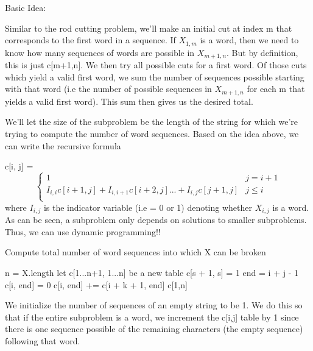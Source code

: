 \documentclass[11pt,a4paper]{article}
\begin{document}
Basic Idea: 

Similar to the rod cutting problem, we'll make an initial cut at index m that corresponds to the first word in a sequence. If $X_{1,m}$ is a word, then we need to know how many sequences of words are possible in $X_{m+1, n}$. But by definition, this is just c[m+1,n]. We then try all possible cuts for a first word. Of those cuts which yield a valid first word, we sum the number of sequences possible starting with that word (i.e the number of possible sequences in $X_{m+1,n}$ for each m that yields a valid first word). This sum then gives us the desired total.

We'll let the size of the subproblem be the length of the string for which we're trying to compute the number of word sequences. Based on the idea above, we can write the recursive formula

c[i, j] = 
\[ \begin{cases} 
      1 & j = i + 1 \\
      I_{i,i}c[i+1,j] + I_{i,i+1}c[i+2,j] ... + I_{i,j}c[j+1,j] & j \leq i \\
   \end{cases}
\]
where $I_{i,j}$ is the indicator variable (i.e = 0 or 1) denoting whether $X_{i,j}$ is a word. As can be seen, a subproblem only depends on solutions to smaller subproblems. Thus, we can use dynamic programming!!

\begin{algorithm}
\caption{Compute total number of word sequences into which X can be broken}
\begin{algorithmic}[1]
	\State n = X.length
	\State let c[1...n+1, 1...n] be a new table
	 
		\State c[s + 1, s] = 1
	\EndFor
	  
		  
			\State end = i + j - 1 
			\State c[i, end] = 0   
			  
					\State c[i, end] += c[i + k + 1, end]
				\EndIf
			\EndFor
		\EndFor
	\EndFor
	\State \Return c[1,n]
\EndFunction
\end{algorithmic}
\end{algorithm}

We initialize the number of sequences of an empty string to be 1. We do this so that if the entire subproblem is a word, we increment the c[i,j] table by 1 since there is one sequence possible of the remaining characters (the empty sequence) following that word. 
\end{document}
